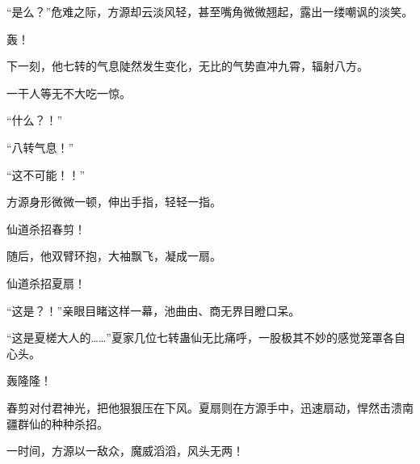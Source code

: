 \begin{this_body}
“是么？”危难之际，方源却云淡风轻，甚至嘴角微微翘起，露出一缕嘲讽的淡笑。

轰！

下一刻，他七转的气息陡然发生变化，无比的气势直冲九霄，辐射八方。

一干人等无不大吃一惊。

“什么？！”

“八转气息！”

“这不可能！！”

方源身形微微一顿，伸出手指，轻轻一指。

仙道杀招春剪！

随后，他双臂环抱，大袖飘飞，凝成一扇。

仙道杀招夏扇！

“这是？！”亲眼目睹这样一幕，池曲由、商无界目瞪口呆。

“这是夏槎大人的……”夏家几位七转蛊仙无比痛呼，一股极其不妙的感觉笼罩各自心头。

轰隆隆！

春剪对付君神光，把他狠狠压在下风。夏扇则在方源手中，迅速扇动，悍然击溃南疆群仙的种种杀招。

一时间，方源以一敌众，魔威滔滔，风头无两！

\end{this_body}

